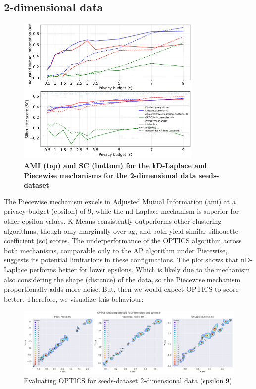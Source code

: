 \subsection{2-dimensional data}
\begin{figure}[H]
  \centering
  \caption{\textbf{AMI (top) and SC (bottom) for the kD-Laplace and Piecewise mechanisms for the 2-dimensional data seeds-dataset}}
  \includegraphics[width=0.8\textwidth]{Results/kd-laplace/kd-Laplace/seeds-dataset/ami-and-sc_2_dimensions.png}

  \label{fig:validation-seeds-dataset_comparison_2d-laplace}
\end{figure}
The Piecewise mechanism excels in Adjusted Mutual Information (\gls{ami}) at a privacy budget (epsilon) of 9, while the nd-Laplace mechanism is superior for other epsilon values. K-Means consistently outperforms other clustering algorithms, though only marginally over \gls{ag}, and both yield similar silhouette coefficient (\gls{sc}) scores. The underperformance of the OPTICS algorithm across both mechanisms, comparable only to the AP algorithm under Piecewise, suggests its potential limitations in these configurations.
\newpage
The plot shows that nD-Laplace performs better for lower epsilons. Which is likely due to the mechanism also considering the shape (distance) of the data, so the Piecewise mechanism proportionally adds more noise. But, then we would expect OPTICS to score better. Therefore, we visualize this behaviour:
\begin{figure}[H]
    \centering
    \includegraphics[width=1\linewidth]{Discussion/behaviour-2d-seeds-dataset&optics.png}
    \caption{Evaluating OPTICS for seeds-dataset 2-dimensional data (epsilon 9)}
    \label{fig:evaluate-optics-seeds-dataset-2d-9eps}
\end{figure}
